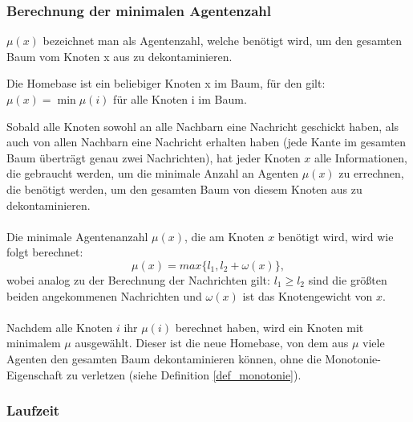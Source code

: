 \subsubsection{Berechnung der minimalen Agentenzahl}

\begin{mydef}
	$\mu(x)$ bezeichnet man als Agentenzahl, welche benötigt wird, um den gesamten Baum vom Knoten x aus zu dekontaminieren. 
\end{mydef}

\begin{mydef}\label{def_homebase}
	Die Homebase ist ein beliebiger Knoten x im Baum, für den gilt: $\mu(x) = \min \mu(i)$ für alle Knoten i im Baum.
\end{mydef}

Sobald alle Knoten sowohl an alle Nachbarn eine Nachricht geschickt haben, als auch von allen Nachbarn eine Nachricht erhalten haben (jede Kante im gesamten Baum überträgt genau zwei Nachrichten), hat jeder Knoten $x$ alle Informationen, die gebraucht werden, um die minimale Anzahl an Agenten $\mu(x)$ zu errechnen, die benötigt werden, um den gesamten Baum von diesem Knoten aus zu dekontaminieren.
\\
\\
Die minimale Agentenanzahl $\mu(x)$, die am Knoten $x$ benötigt wird, wird wie folgt berechnet:
$$\mu(x) = max\{l_{1},  l_{2} + \omega(x)\},$$ wobei analog zu der Berechnung der Nachrichten gilt: $l_{1} \ge l_{2}$ sind die größten beiden angekommenen Nachrichten und $\omega(x)$ ist das Knotengewicht von $x$.
\\
\\
Nachdem alle Knoten $i$ ihr $\mu(i)$ berechnet haben, wird ein Knoten mit minimalem $\mu$ ausgewählt. Dieser ist die neue Homebase, von dem aus $\mu$ viele Agenten den gesamten Baum dekontaminieren können, ohne die Monotonie-Eigenschaft zu verletzen (siehe Definition \ref{def_monotonie}).


\subsubsection{Laufzeit}

